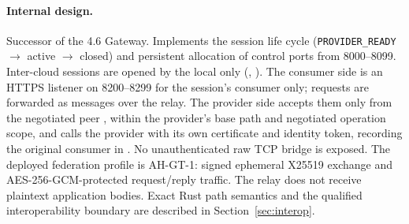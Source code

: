 \documentclass[a4paper]{arrowhead}
\newcommand{\sys}[1]{\textcolor{ArrowheadBlue}{\textbf{\ahbreak{#1}}}}      %
\begin{document}
\paragraph{Internal design.} Successor of the 4.6 Gateway. Implements the session life cycle
(\texttt{PROVIDER\_READY} $\rightarrow$ active $\rightarrow$ closed) and persistent allocation of
control ports from 8000--8099. Inter-cloud sessions are opened by the local \sys{Gatekeeper} only
(, ). The consumer
side is an HTTPS listener on 8200--8299 for the session's consumer only; requests are forwarded as
messages over the relay. The provider side accepts them only from the negotiated peer
\sys{GateTunnel}, within the provider's base path and negotiated operation scope,
and calls the provider with its own
certificate and identity token, recording the original consumer in
. No unauthenticated raw TCP bridge is exposed. The deployed federation profile is
AH-GT-1: signed ephemeral X25519 exchange and AES-256-GCM-protected request/reply
traffic. The relay does not receive plaintext application bodies. Exact Rust path
semantics and the qualified interoperability boundary are described in
Section~\ref{sec:interop}.
\end{document}
